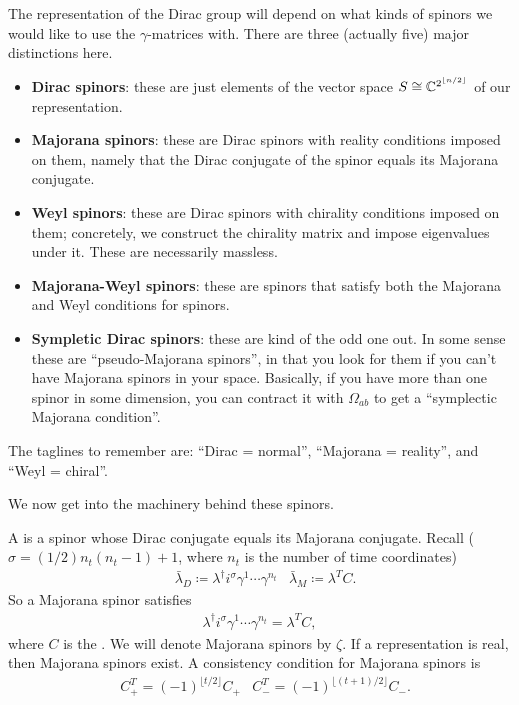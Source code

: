 \documentclass[11pt]{article}
\begin{document}
\begin{iidea}
    The representation of the Dirac group will depend on what kinds
    of spinors we would like to use the $\gamma$-matrices with.
    There are three (actually five) major distinctions here.
    \begin{itemize}
        \item \textbf{Dirac spinors}: these are just elements of
        the vector space $S \cong \mathbb{C}^{2^{\lfloor n/2 \rfloor}}$ of our
        representation.
        \item \textbf{Majorana spinors}: these are Dirac spinors with
        reality conditions imposed on them, namely that the Dirac conjugate
        of the spinor equals its Majorana conjugate.
        \item \textbf{Weyl spinors}: these are Dirac spinors with chirality
        conditions imposed on them; concretely, we construct the chirality
        matrix and impose eigenvalues under it. These are necessarily massless. 
        \item \textbf{Majorana-Weyl spinors}: these are spinors that satisfy
        both the Majorana and Weyl conditions for spinors.
        \item \textbf{Sympletic Dirac spinors}: these are kind of the odd one out.
        In some sense these are ``pseudo-Majorana spinors'', in that you look for them
        if you can't have Majorana spinors in your space. Basically, if you have more 
        than one spinor in some dimension, you can contract it with $\Omega_{ab}$ to get a
        ``symplectic Majorana condition''.
    \end{itemize}
    The taglines to remember are: ``Dirac = normal'', ``Majorana = reality'',
    and ``Weyl = chiral''.
\end{iidea}

\noin
We now get into the machinery behind these spinors.

\begin{definition}
    A  is a spinor whose Dirac conjugate equals its
    Majorana conjugate. Recall ($\sigma = (1/2)n_t (n_t - 1) + 1$, where $n_t$
    is the number of time coordinates)
    \begin{align*}
        & \bar{\lambda}_D \coloneqq \lambda^\dagger i^{\sigma} \gamma^1 \cdots \gamma^{n_t}
        & \bar{\lambda}_M \coloneqq \lambda^T C.
    \end{align*}
    So a Majorana spinor satisfies
    \begin{align*}
        \lambda^\dagger i^\sigma \gamma^1 \cdots \gamma^{n_t} = \lambda^T C,
    \end{align*}
    where $C$ is the . We will
    denote Majorana spinors by $\zeta$. If a representation
    is real, then Majorana spinors exist. A consistency
    condition for Majorana spinors is
    \begin{align*}
        & C_+^T = (-1)^{\lfloor t/2 \rfloor} C_+
        & C_-^T = (-1)^{\lfloor (t + 1)/2 \rfloor} C_-.
    \end{align*}
\end{definition}
\end{document}
